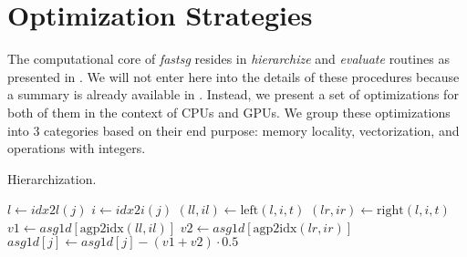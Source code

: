 \section{Optimization Strategies}
\label{sec:op_strategies}

The computational core of \textit{fastsg} resides in \textit{hierarchize} and
\textit{evaluate} routines as presented in \cite{}. We will not enter here into
the details of these procedures because a summary is already available in
\cite{murarasu2011}. Instead, we present a set of optimizations for both of them
in the context of CPUs and GPUs. We group these optimizations into 3 categories
based on their end purpose: memory locality, vectorization, and operations with
integers.

\begin{algorithm}[tbp]
\small{
	\caption{Hierarchization.}
 	\label{alg:hierarchization}                       

 	\begin{algorithmic}[1]
 				\State {}
 			\EndFor
 		\EndFor
	\end{algorithmic}
 
	\begin{algorithmic}[1]
	 				\State $l \leftarrow idx2l(j)$
	 			\EndIf
	 			\State $i \leftarrow idx2i(j)$
	 			\State $(\textit{ll}, \textit{il}) \leftarrow \text{left}(l, i, t)$
	 			\State $(\textit{lr}, \textit{ir}) \leftarrow \text{right}(l, i, t)$
	 			\State $\textit{v1} \leftarrow \textit{asg1d}[\text{agp2idx}(\textit{ll},
	 			\textit{il})]$ \State $\textit{v2} \leftarrow
	 			\textit{asg1d}[\text{agp2idx}(\textit{lr}, \textit{ir})]$ \State$\textit{asg1d}[j] \leftarrow \textit{asg1d}[j] - (\textit{v1} +\textit{v2}) \cdot 0.5$
			\EndFor
		\EndProcedure
	\end{algorithmic}
}
\end{algorithm}

